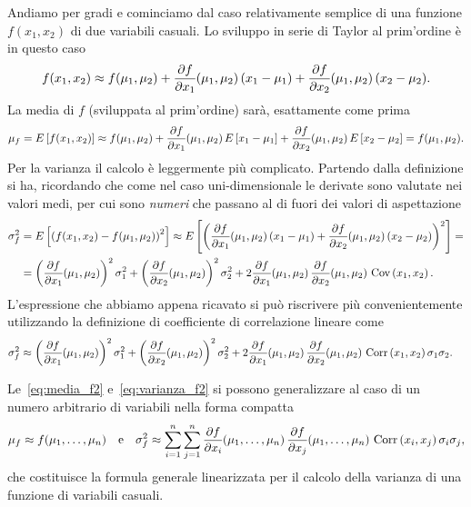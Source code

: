 Andiamo per gradi e cominciamo dal caso relativamente semplice di una funzione
$f(x_1, x_2)$ di due variabili casuali. Lo sviluppo in serie di Taylor al
prim'ordine è in questo caso
\begin{align*}
  f(x_1, x_2) \approx f(\mu_1, \mu_2) +
  \pd{f}{x_1}{\mu_1, \mu_2}(x_1 - \mu_1) +
  \pd{f}{x_2}{\mu_1, \mu_2}(x_2 - \mu_2).
\end{align*}
La media di $f$ (sviluppata al prim'ordine) sarà, esattamente come prima
\begin{align}\label{eq:media_f2}
  \mu_f = \expect{f(x_1, x_2)} \approx
  f(\mu_1, \mu_2) +
  \pd{f}{x_1}{\mu_1, \mu_2}\expect{x_1 - \mu_1} +
  \pd{f}{x_2}{\mu_1, \mu_2}\expect{x_2 - \mu_2} = f(\mu_1, \mu_2).
\end{align}
Per la varianza il calcolo è leggermente più complicato. Partendo dalla
definizione si ha, ricordando che come nel caso uni-dimensionale le derivate
sono valutate nei valori medi, per cui sono \emph{numeri} che passano al di
fuori dei valori di aspettazione
\begin{align*}
  \sigma^2_f & =
  \expect{\left(f(x_1, x_2) - f(\mu_1, \mu_2)\right)^2} \approx
  \expect{\left(
    \pd{f}{x_1}{\mu_1, \mu_2}(x_1 - \mu_1) +
    \pd{f}{x_2}{\mu_1, \mu_2}(x_2 - \mu_2)
    \right)^2} =\\
  & =
  \left(\pd{f}{x_1}{\mu_1, \mu_2}\right)^2 \sigma^2_1 +
  \left(\pd{f}{x_2}{\mu_1, \mu_2}\right)^2 \sigma^2_2 +
  2\pd{f}{x_1}{\mu_1, \mu_2}\pd{f}{x_2}{\mu_1, \mu_2}\,\cov{x_1}{x_2}.
\end{align*}
L'espressione che abbiamo appena ricavato si può riscrivere più
convenientemente utilizzando la definizione di coefficiente di correlazione
lineare come
\begin{align}\label{eq:varianza_f2}
  \sigma^2_f & \approx
  \left(\pd{f}{x_1}{\mu_1, \mu_2}\right)^2 \sigma^2_1 +
  \left(\pd{f}{x_2}{\mu_1, \mu_2}\right)^2 \sigma^2_2 +
  2\pd{f}{x_1}{\mu_1, \mu_2}\pd{f}{x_2}{\mu_1, \mu_2}\,
  \corr{x_1}{x_2} \sigma_1 \sigma_2.
\end{align}

Le~\eqref{eq:media_f2} e~\eqref{eq:varianza_f2} si possono generalizzare al
caso di un numero arbitrario di variabili nella forma compatta
\begin{align}\label{eq:media_varianza_func}
  \mu_f \approx f(\mu_1,\ldots,\mu_n) \quad \text{e} \quad
  \sigma^2_f \approx \sum_{i = 1}^n \sum_{j = 1}^n
  \pd{f}{x_i}{\mu_1, \ldots, \mu_n}\pd{f}{x_j}{\mu_1, \ldots, \mu_n}
  \,\corr{x_i}{x_j} \sigma_i \sigma_j,
\end{align}
che costituisce la formula generale linearizzata per il calcolo della
varianza di una funzione di variabili casuali.


